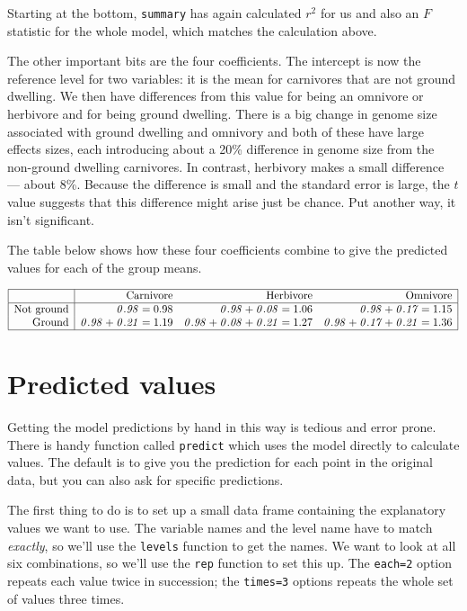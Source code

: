 Starting at the bottom, {\tt summary} has again calculated $r^2$ for us 
and also an $F$ statistic for the whole model, which matches the 
calculation above. 

The other important bits are the four coefficients. The intercept is 
now the reference level for two variables: it is the mean for 
carnivores that are not ground dwelling. We then have differences from 
this value for being an omnivore or herbivore and for being ground 
dwelling. There is a big change in genome size associated with ground 
dwelling and omnivory and both of these have large effects sizes, each 
introducing about a 20\% difference in genome size from the non-ground 
dwelling carnivores. In contrast, herbivory makes a small difference 
--- about 8\%. Because the difference is small and the standard error 
is large, the $t$ value suggests that this difference might arise just 
be chance. Put another way, it isn't significant.

The table below shows how these four coefficients combine to give the 
predicted values for each of the group means.

\[\begin{array}{|r|rrr|}
\hline
	       & \textrm{Carnivore} & \textrm{Herbivore} & \textrm{Omnivore}\\
\hline
\textrm{Not ground} & {\it 0.98} = 0.98    & {\it 0.98  + 0.08} =1.06    & {\it 0.98 + 0.17} =1.15 \\
\textrm{Ground}     & {\it 0.98 + 0.21} = 1.19    & {\it 0.98  + 0.08   + 0.21} =1.27   & {\it 0.98 + 0.17  + 0.21} =1.36\\
\hline
\end{array}\]

\section{Predicted values}

Getting the model predictions by hand in this way is tedious and error 
prone. There is handy function called {\tt predict} which uses the 
model directly to calculate values. The default is to give you the 
prediction for each point in the original data, but you can also ask 
for specific predictions.

The first thing to do is to set up a small data frame containing the 
explanatory values we want to use. The variable names and the level 
name have to match {\it exactly}, so we'll use the {\tt levels} 
function to get the names. We want to look at all six combinations, so 
we'll use the {\tt rep} function to set this up. The {\tt each=2} 
option repeats each value twice in succession; the {\tt times=3} 
options repeats the whole set of values three times.

